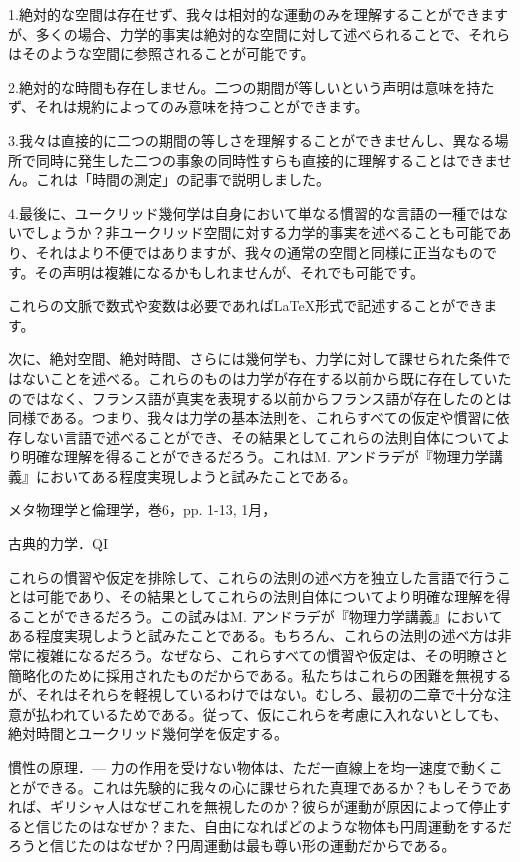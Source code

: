 \documentclass[a4paper,11pt,openany]{ltjsbook}
\begin{document}
1.絶対的な空間は存在せず、我々は相対的な運動のみを理解することができますが、多くの場合、力学的事実は絶対的な空間に対して述べられることで、それらはそのような空間に参照されることが可能です。

2.絶対的な時間も存在しません。二つの期間が等しいという声明は意味を持たず、それは規約によってのみ意味を持つことができます。

3.我々は直接的に二つの期間の等しさを理解することができませんし、異なる場所で同時に発生した二つの事象の同時性すらも直接的に理解することはできません。これは「時間の測定」の記事で説明しました。

4.最後に、ユークリッド幾何学は自身において単なる慣習的な言語の一種ではないでしょうか？非ユークリッド空間に対する力学的事実を述べることも可能であり、それはより不便ではありますが、我々の通常の空間と同様に正当なものです。その声明は複雑になるかもしれませんが、それでも可能です。

これらの文脈で数式や変数は必要であればLaTeX形式で記述することができます。

次に、絶対空間、絶対時間、さらには幾何学も、力学に対して課せられた条件ではないことを述べる。これらのものは力学が存在する以前から既に存在していたのではなく、フランス語が真実を表現する以前からフランス語が存在したのとは同様である。つまり、我々は力学の基本法則を、これらすべての仮定や慣習に依存しない言語で述べることができ、その結果としてこれらの法則自体についてより明確な理解を得ることができるだろう。これはM. アンドラデが『物理力学講義』においてある程度実現しようと試みたことである。

 メタ物理学と倫理学，巻6，pp. 1-13, 1月，

古典的力学．QI

これらの慣習や仮定を排除して、これらの法則の述べ方を独立した言語で行うことは可能であり、その結果としてこれらの法則自体についてより明確な理解を得ることができるだろう。この試みはM. アンドラデが『物理力学講義』においてある程度実現しようと試みたことである。もちろん、これらの法則の述べ方は非常に複雑になるだろう。なぜなら、これらすべての慣習や仮定は、その明瞭さと簡略化のために採用されたものだからである。私たちはこれらの困難を無視するが、それはそれらを軽視しているわけではない。むしろ、最初の二章で十分な注意が払われているためである。従って、仮にこれらを考慮に入れないとしても、絶対時間とユークリッド幾何学を仮定する。

慣性の原理．— 力の作用を受けない物体は、ただ一直線上を均一速度で動くことができる。これは先験的に我々の心に課せられた真理であるか？もしそうであれば、ギリシャ人はなぜこれを無視したのか？彼らが運動が原因によって停止すると信じたのはなぜか？また、自由になればどのような物体も円周運動をするだろうと信じたのはなぜか？円周運動は最も尊い形の運動だからである。
\end{document}
